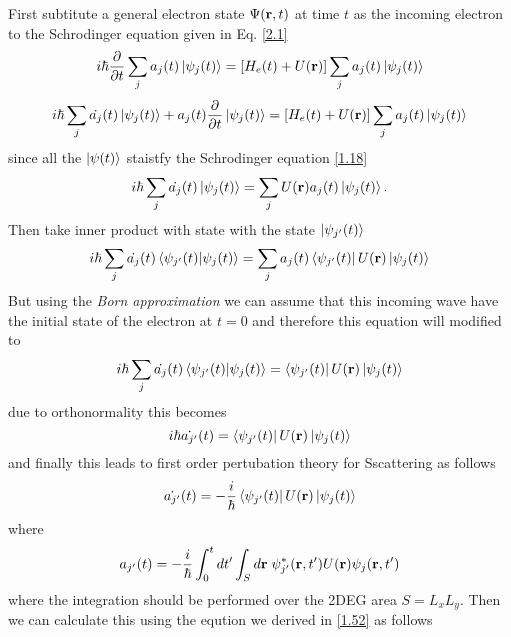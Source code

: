 \noindent
First subtitute a general electron state $\Psi(\vb{r},t)$ at time $t$ as the incoming electron to the Schrodinger equation given in Eq. \eqref{2.1}
\begin{equation} \label{2.5}
  i \hbar \pdv{t} \sum_j a_j(t) \ket{\psi_j(t)}= [H_e(t) + U(\vb{r})] \sum_j a_j(t) \ket{\psi_j(t)}
\end{equation}
\begin{equation} \label{2.6}
  i \hbar\sum_j   \dot{a_j}(t) \ket{\psi_j(t)} + a_j(t)\pdv{t}\ket{\psi_j(t)}= [H_e(t) + U(\vb{r})] \sum_j a_j(t) \ket{\psi_j(t)}
\end{equation}
since all the ${\ket{\psi(t)}}$ staistfy the Schrodinger equation \eqref{1.18}
\begin{equation} \label{2.7}
  i \hbar\sum_j   \dot{a_j}(t) \ket{\psi_j(t)} = \sum_j U(\vb{r}) a_j(t) \ket{\psi_j(t)}.
\end{equation}
Then take inner product with state with the state $\ket{\psi_{j'}(t)}$
\begin{equation} \label{2.8}
  i \hbar\sum_j   \dot{a_j}(t) \braket{\psi_{j'}(t)}{\psi_j(t)} = \sum_j
  a_j(t) \bra{\psi_{j'}(t)} U(\vb{r}) \ket{\psi_j(t)}
\end{equation}
But using the \textit{Born approximation} we can assume that this incoming wave have the initial state of the electron at $t=0$ and therefore this equation will modified to
\begin{equation} \label{2.9}
  i \hbar\sum_j   \dot{a_j}(t) \braket{\psi_{j'}(t)}{\psi_j(t)} =
  \bra{\psi_{j'}(t)} U(\vb{r}) \ket{\psi_j(t)}
\end{equation}
due to orthonormality this becomes
\begin{equation} \label{2.10}
  i \hbar \dot{a_{j'}}(t) =
  \bra{\psi_{j'}(t)} U(\vb{r}) \ket{\psi_j(t)}
\end{equation}
and finally this leads to first order pertubation theory for Sscattering as follows
\begin{equation} \label{2.11}
   \dot{a_{j'}}(t) =
  -\frac{i}{\hbar}\bra{\psi_{j'}(t)} U(\vb{r}) \ket{\psi_j(t)}
\end{equation}
where
\begin{equation} \label{2.12}
   a_{j'}(t) =
  -\frac{i}{\hbar}
  \int_0^t dt' \int_S d\vb{r} \;
  \psi_{j'}^{*} (\vb{r},t') U(\vb{r}) {\psi_j(\vb{r},t')}
\end{equation}
where the integration should be performed over the 2DEG area $S=L_xL_y$. Then we can calculate this using the eqution we derived in \eqref{1.52} as follows
